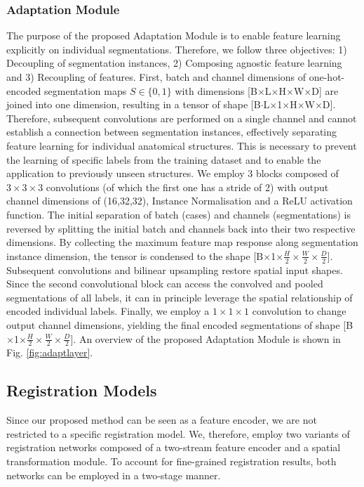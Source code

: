 \subsubsection*{Adaptation Module}
The purpose of the proposed Adaptation Module is to enable feature learning explicitly on individual segmentations. Therefore, we follow three objectives: 1) Decoupling of segmentation instances, 2) Composing agnostic feature learning  and 3) Recoupling of features.
First, batch and channel dimensions of one-hot-encoded segmentation maps $S\in \{0, 1\}$ with dimensions [B$\times$L$\times$H$\times$W$\times$D] are joined into one dimension, resulting in a tensor of shape [B$\cdot$L$\times$1$\times$H$\times$W$\times$D]. Therefore, subsequent convolutions are performed on a single channel and cannot establish a connection between segmentation instances, effectively separating feature learning for individual anatomical structures. This is necessary to prevent the learning of specific labels from the training dataset and to enable the application to previously unseen structures. 
We employ 3 blocks composed of $3\times3\times3$ convolutions (of which the first one has a stride of 2) with output channel dimensions of (16,32,32), Instance Normalisation and a ReLU activation function. 
The initial separation of batch (cases) and channels (segmentations) is reversed by splitting the initial batch and channels back into their two respective dimensions. By collecting the maximum feature map response along segmentation instance dimension, the tensor is condensed to the shape [B$\times$1$\times\frac{H}{2}\times\frac{W}{2}\times\frac{D}{2}$]. Subsequent convolutions and bilinear upsampling restore spatial input shapes. 
Since the second convolutional block can access the convolved and pooled segmentations of all labels, it can in principle leverage the spatial relationship of encoded individual labels.
Finally, we employ a $1\times1\times1$ convolution to change output channel dimensions, yielding the final encoded segmentations of shape [B$\times$1$\times\frac{H}{2}\times\frac{W}{2}\times\frac{D}{2}$]. An overview of the proposed Adaptation Module is shown in Fig. \ref{fig:adaptlayer}.


\subsection{Registration Models}
Since our proposed method can be seen as a feature encoder, we are not restricted to a specific registration model. We, therefore, employ two variants of registration networks composed of a two-stream feature encoder and a spatial transformation module. To account for fine-grained registration results, both networks can be employed in a two-stage manner. 

